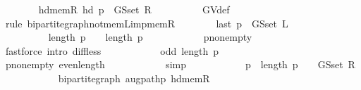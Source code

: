 \begin{isabellebody}
\ \ \ \ \ \ \isamarkupfalse%
\ hd{\isacharunderscore}{\kern0pt}mem{\isacharunderscore}{\kern0pt}R{\isacharcolon}{\kern0pt}\ {\isachardoublequoteopen}hd\ p\ {\isasymin}\ G{\isachardot}{\kern0pt}S{\isachardot}{\kern0pt}set\ R{\isachardoublequoteclose}\isanewline
\ \ \ \ \ \ \ \ \isamarkupfalse%
\ G{\isachardot}{\kern0pt}V{\isacharunderscore}{\kern0pt}def\isanewline
\ \ \ \ \ \ \ \ \isamarkupfalse%
\ {\isacharparenleft}{\kern0pt}rule\ bipartite{\isacharunderscore}{\kern0pt}graph{\isachardot}{\kern0pt}not{\isacharunderscore}{\kern0pt}mem{\isacharunderscore}{\kern0pt}L{\isacharunderscore}{\kern0pt}imp{\isacharunderscore}{\kern0pt}mem{\isacharunderscore}{\kern0pt}R{\isacharparenright}{\kern0pt}\isanewline
\ \ \ \ \ \ \isamarkupfalse%
\ {\isachardoublequoteopen}last\ p\ {\isasymin}\ G{\isachardot}{\kern0pt}S{\isachardot}{\kern0pt}set\ L{\isachardoublequoteclose}\isanewline
\ \ \ \ \ \ \isamarkupfalse%
\ {\isacharminus}{\kern0pt}\isanewline
\ \ \ \ \ \ \ \ \isamarkupfalse%
\ {\isachardoublequoteopen}length\ p\ {\isacharminus}{\kern0pt}\ {}\ {\isacharless}{\kern0pt}\ length\ p{\isachardoublequoteclose}\isanewline
\ \ \ \ \ \ \ \ \ \ \isamarkupfalse%
\ p{\isacharunderscore}{\kern0pt}non{\isacharunderscore}{\kern0pt}empty\isanewline
\ \ \ \ \ \ \ \ \ \ \isamarkupfalse%
\ {\isacharparenleft}{\kern0pt}fastforce\ intro{\isacharcolon}{\kern0pt}\ diff{\isacharunderscore}{\kern0pt}less{\isacharparenright}{\kern0pt}\isanewline
\ \ \ \ \ \ \ \ \isamarkupfalse%
\ \isamarkupfalse%
\ {\isachardoublequoteopen}odd\ {\isacharparenleft}{\kern0pt}length\ p\ {\isacharminus}{\kern0pt}\ {}{\isacharparenright}{\kern0pt}{\isachardoublequoteclose}\isanewline
\ \ \ \ \ \ \ \ \ \ \isamarkupfalse%
\ p{\isacharunderscore}{\kern0pt}non{\isacharunderscore}{\kern0pt}empty\ even{\isacharunderscore}{\kern0pt}length\isanewline
\ \ \ \ \ \ \ \ \ \ \isamarkupfalse%
\ simp\isanewline
\ \ \ \ \ \ \ \ \isamarkupfalse%
\ \isamarkupfalse%
\ {\isachardoublequoteopen}p\ {\isacharbang}{\kern0pt}\ {\isacharparenleft}{\kern0pt}length\ p\ {\isacharminus}{\kern0pt}\ {}{\isacharparenright}{\kern0pt}\ {\isasymnotin}\ G{\isachardot}{\kern0pt}S{\isachardot}{\kern0pt}set\ R{\isachardoublequoteclose}\isanewline
\ \ \ \ \ \ \ \ \ \ \isamarkupfalse%
\ bipartite{\isacharunderscore}{\kern0pt}graph\ augpath{\isacharunderscore}{\kern0pt}p\ hd{\isacharunderscore}{\kern0pt}mem{\isacharunderscore}{\kern0pt}R\isanewline

\end{isabellebody}
